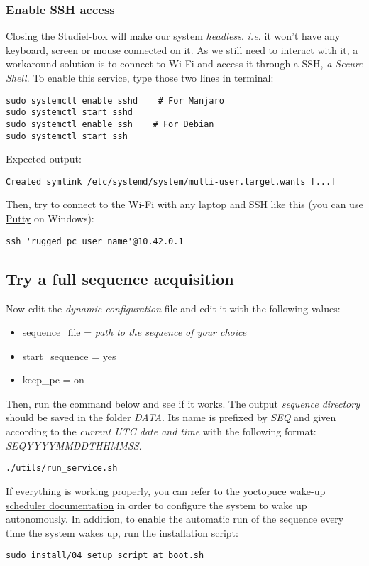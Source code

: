 \subsubsection{Enable SSH access}
Closing the Studiel-box will make our system \emph{headless}.
\emph{i.e.} it won't have any keyboard, screen or mouse connected on it. 
As we still need to interact  with it, a workaround solution is to connect to Wi-Fi 
and access it through a SSH, 
\emph{a Secure Shell}. To enable this service, type those two lines in terminal:
\begin{lstlisting}
sudo systemctl enable sshd    # For Manjaro 
sudo systemctl start sshd
sudo systemctl enable ssh    # For Debian 
sudo systemctl start ssh
\end{lstlisting}
Expected output:
\vspace{-10pt}
\begin{lstlisting}
Created symlink /etc/systemd/system/multi-user.target.wants [...]
\end{lstlisting}
Then, try to connect to the Wi-Fi with any laptop and SSH like this 
(you can use \href{https://www.putty.org/}{Putty} on Windows):
\begin{lstlisting}
ssh 'rugged_pc_user_name'@10.42.0.1
\end{lstlisting}

\subsection{Try a full sequence acquisition}
Now edit the \textit{dynamic configuration} file and edit it with the
following values:
\begin{itemize}
	\item sequence\_file = \textit{path to the sequence of your choice} 
	\item start\_sequence = yes
	\item keep\_pc = on
\end{itemize}

Then, run the command below and see if it works. The output \textit{sequence
directory} should be saved in the folder \textit{DATA}. Its name is prefixed by
\textit{SEQ} and given according to the \textit{current UTC date and time} 
with the following format: \textit{SEQYYYYMMDDTHHMMSS}.
\begin{lstlisting}
./utils/run_service.sh
\end{lstlisting}
If everything is working properly, you can refer to the yoctopuce 
\href{https://www.yoctopuce.com/EN/products/yoctohub-wireless/doc/YHUBWLN1.usermanual.html#CHAP9SEC1}{wake-up scheduler documentation} 
in order to configure the system to wake up autonomously.
In addition, to enable the automatic run of the sequence every time the system
wakes up, run the installation script: 
\begin{lstlisting}
sudo install/04_setup_script_at_boot.sh
\end{lstlisting}

